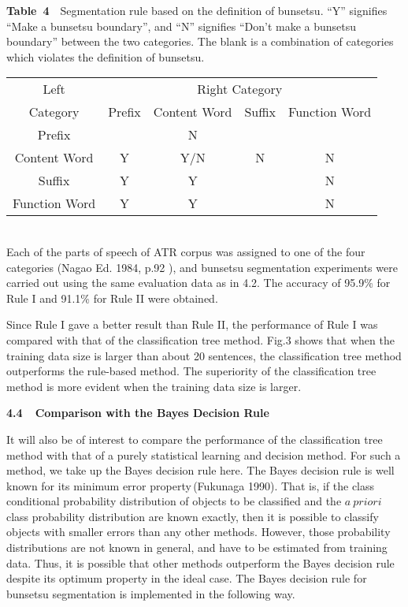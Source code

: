 \begin{table}[t]
\begin{center}
{\bf Table\ 4}\ \  Segmentation rule based on the definition of
bunsetsu. ``Y'' signifies ``Make a bunsetsu boundary'', and ``N'' 
signifies ``Don't make a bunsetsu boundary'' between the two
categories. The blank is  a combination of categories which violates
the definition of bunsetsu.
\vspace{5mm}\\
\small
\begin{tabular}{|c|c|c|c|c|}
\hline
Left &\multicolumn{4}{c|}{Right Category}\\
\cline{2-5}
Category& Prefix  &Content Word  &Suffix   &Function Word\\ \hline
Prefix &  & N &   &\\ \hline
Content Word & Y  &Y/N  & N  &N\\ \hline
Suffix &Y  & Y &   &N\\ \hline
Function Word & Y  &Y  &   &N\\ \hline
\end{tabular}
\end{center}
\end{table}
\vspace{5pt}\\
Each of the parts of speech of ATR corpus was assigned to one of the
four  categories (Nagao Ed. 1984, p.92 ), and bunsetsu segmentation 
experiments were carried out using the same evaluation data as in 4.2.
The accuracy of 95.9\% for Rule I and 91.1\% for Rule II were
obtained.
 
Since Rule I gave a better result than Rule II,  the performance of
Rule I was compared with that of the classification tree method.
Fig.3 shows  that when the training data size is larger than about 20 
sentences, the classification tree method outperforms the rule-based
method.  The superiority of the classification tree method is more 
evident when the training data size is larger.
\begin{flushleft}
{\large \bf 4.4\ \ Comparison with the Bayes Decision Rule  }
\end{flushleft}
It will also be of interest to compare the performance of the
classification tree method with that  of a purely statistical learning 
and decision method. For such a method, we take up the Bayes decision
rule here.
 The Bayes decision
rule is well known for its minimum error property\,(Fukunaga 1990). That is, if the
class
conditional probability distribution of objects to be classified and
the $a\ priori$ class probability distribution are known exactly, then it is
possible
to classify objects with smaller errors than any other
methods. However, those
probability distributions are not known in general, and have to be
estimated
from training data. Thus, it is possible that other methods outperform 
the Bayes decision rule despite its optimum property in the ideal case.
  The Bayes decision rule for bunsetsu segmentation is implemented in
the
following way. 

